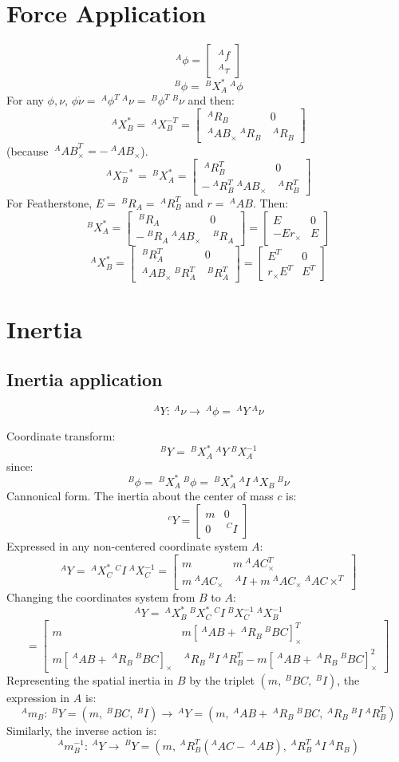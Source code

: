 \documentclass[11pt,twoside,a4paper]{article}
\newcommand{\BIN}{\begin{bmatrix}}
\newcommand{\BOUT}{\end{bmatrix}}
\newcommand{\aRb}{\ {}^{A}R_B}
\newcommand{\amb}{\ {}^{A}m_B}
\newcommand{\apb}{{\ {}^{A}{AB}{}}}
\newcommand{\aXb}{\ {}^{A}X_B}
\newcommand{\bRa}{\ {}^{B}R_A}
\newcommand{\bXa}{\ {}^{B}X_A}
\newcommand{\afs}{\ {}^{A}\phi}
\newcommand{\bfs}{\ {}^{B}\phi}
\newcommand{\af}{\ {}^{A}f}
\newcommand{\an}{\ {}^{A}\tau}
\newcommand{\avs}{\ {}^{A}\nu}
\newcommand{\bvs}{\ {}^{B}\nu}
\newcommand{\aI}{\ {}^{A}I}
\newcommand{\bI}{\ {}^{B}I}
\newcommand{\cI}{\ {}^{C}I}
\newcommand{\aY}{\ {}^{A}Y}
\newcommand{\bY}{\ {}^{B}Y}
\newcommand{\cY}{\ {}^{c}Y}
\newcommand{\aXc}{\ {}^{A}X_C}
\newcommand{\apc}{\ {}^{A}{AC}{}}
\newcommand{\bXc}{\ {}^{B}X_C}
\newcommand{\bpc}{\ {}^{B}{BC}{}}
\begin{document}
\section{Force Application}
$$\afs = \BIN \af \\ \an \BOUT$$
$$\bfs = \bXa^* \afs$$
For any $\phi,\nu$, $\phi\dot\nu = \afs^T \avs = \bfs^T \bvs$ and then:
$$\aXb^* = \aXb^{-T} = \BIN \aRb & 0 \\ \apb_\times \aRb & \aRb \BOUT$$
(because $\apb_\times^T = - \apb_\times$).
$$\aXb^{-*} = \bXa^* = \BIN \aRb^T & 0 \\ -\aRb^T \apb_\times  & \aRb^T \BOUT$$
For Featherstone, $E = \bRa =\aRb^T$ and $r = \apb$. Then:
$$\bXa^* = \BIN \bRa & 0 \\ -\bRa \apb_\times & \bRa \BOUT = \BIN E & 0 \\ - E r_\times & E \BOUT $$
$$\aXb^* = \BIN \bRa^T & 0 \\  \apb_\times \bRa^T & \bRa^T \BOUT = \BIN E^T & 0 \\ r_\times E^T & E^T \BOUT $$

\section{Inertia}
\subsection{Inertia application}

$$\aY: \avs \rightarrow \afs = \aY \avs$$

Coordinate transform:
$$\bY = \bXa^{*} \aY \bXa^{-1}$$
since: 
$$\bfs = \bXa^* \bfs = \bXa^* \aI \aXb \bvs$$
Cannonical form. The inertia about the center of mass $c$ is:
$$\cY = \BIN m & 0 \\ 0 & \cI \BOUT$$
Expressed in any non-centered coordinate system $A$:
$$\aY = \aXc^* \cI \aXc^{-1} = \BIN m & m\ ^AAC_\times^T \\  m\ ^AAC_\times & \aI + m \apc_\times \apc\times^T \BOUT $$
Changing the coordinates system from $B$ to $A$:
$$\aY = \aXb^* \bXc^* \cI \bXc^{-1} \aXb^{-1} $$
$$ = \BIN m & m [\apb + \aRb \bpc]_\times^T \\  m [\apb + \aRb \bpc]_\times & \aRb \bI \aRb^T - m [\apb + \aRb \bpc]_\times^2 \BOUT$$
Representing the spatial inertia in $B$ by the triplet $(m,\bpc,\bI)$, the expression in $A$ is:
$$ \amb: \bY = (m,\bpc,\bI) \rightarrow \aY = (m,\apb+\aRb \bpc,\aRb \bI \aRb^T)$$
Similarly, the inverse action is:
$$ \amb^{-1}: \aY \rightarrow \bY = (m,\aRb^T(^AAC-\apb),\aRb^T\aI \aRb) $$
\end{document}
